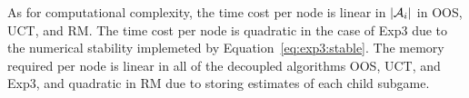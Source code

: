 {As for computational complexity, the time cost per node is linear in $|\mathcal{A}_i|$ in OOS, UCT, and RM. The time cost per node
is quadratic in the case
of Exp3 due to the numerical stability implemeted by Equation~\ref{eq:exp3:stable}. The memory required per node is linear in all of the decoupled
algorithms OOS, UCT, and Exp3, and quadratic in RM due to storing estimates of each child subgame.
}

